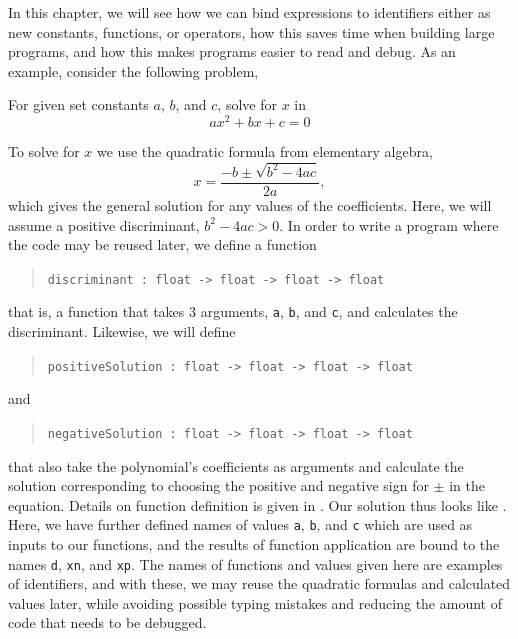 \documentclass[fsharpNotes.tex]{subfiles}
\begin{document}
In this chapter, we will see how we can bind expressions to identifiers either as new constants, functions, or operators, how this saves time when building large programs, and how this makes programs easier to read and debug. As an example, consider the following problem,
\begin{task}{}
  For given set constants $a$, $b$, and $c$, solve for $x$ in
  \begin{equation}
  a x^2+bx+c = 0
\end{equation}
\end{task}
To solve for $x$ we use the quadratic formula from elementary algebra,
\begin{equation}
  x = \frac{-b\pm\sqrt{b^2-4ac}}{2a},
\end{equation}
which gives the general solution for any values of the coefficients. Here, we will assume a positive discriminant, $b^2-4ac>0$. In order to write a program where the code may be reused later, we define a function
\begin{quote}
  \lstinline!discriminant : float -> float -> float -> float!
\end{quote}
that is, a function that takes 3 arguments, \lstinline!a!, \lstinline!b!, and \lstinline!c!, and calculates the discriminant. Likewise, we will define
\begin{quote}
  \lstinline!positiveSolution : float -> float -> float -> float!
\end{quote}
and
\begin{quote}
  \lstinline!negativeSolution : float -> float -> float -> float!
\end{quote}
that also take the polynomial's coefficients as arguments and calculate the solution corresponding to choosing the positive and negative sign for $\pm$ in the equation. Details on function definition is given in . Our solution thus looks like .
%
%
Here, we have further defined names of values \lstinline!a!, \lstinline!b!, and \lstinline!c! which are used as inputs to our functions, and the results of function application are bound to the names \lstinline!d!, \lstinline!xn!, and \lstinline!xp!. The names of functions and values given here are examples of identifiers, and with these, we may reuse the quadratic formulas and calculated values later, while avoiding possible typing mistakes and reducing the amount of code that needs to be debugged.
\end{document}
